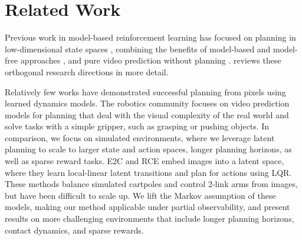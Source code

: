 \section{Related Work}
\label{related_work}

Previous work in model-based reinforcement learning has focused on planning in
low-dimensional state spaces \linebreak \citep{gal2016deeppilco,higuera2018synthesizing,henaff2018planbybackprop,chua2018pets}, combining the benefits of model-based and model-free approaches \citep{kalweit2017blending,nagabandi2017mbmf,weber2017i2a,kurutach2018modeltrpo,buckman2018steve,ha2018worldmodels,wayne2018merlin,igl2018dvrl,srinivas2018upn}, and pure video prediction without planning \citep{oh2015atari,krishnan2015deepkalman,karl2016dvbf,chiappa2017recurrent,babaeizadeh2017sv2p,gemici2017temporalmemory,denton2018stochastic,buesing2018dssm,doerr2018prssm,gregor2018tdvae}.  reviews these orthogonal research directions in more detail.

Relatively few works have demonstrated successful planning from pixels using learned dynamics models. The robotics community focuses on video prediction models for planning \citep{agrawal2016poking,finn2017foresight,ebert2018foresight,zhang2018solar} that deal with the visual complexity of the real world and solve tasks with a simple gripper, such as grasping or pushing objects. In comparison, we focus on simulated environments, where we leverage latent planning to scale to larger state and action spaces, longer planning horizons, as well as sparse reward tasks. E2C \citep{watter2015e2c} and RCE \citep{banijamali2017rce} embed images into a latent space, where they learn local-linear latent transitions and plan for actions using LQR. These methods balance simulated cartpoles and control 2-link arms from images, but have been difficult to scale up. We lift the Markov assumption of these models, making our method applicable under partial observability, and present results on more challenging environments that include longer planning horizons, contact dynamics, and sparse rewards.
